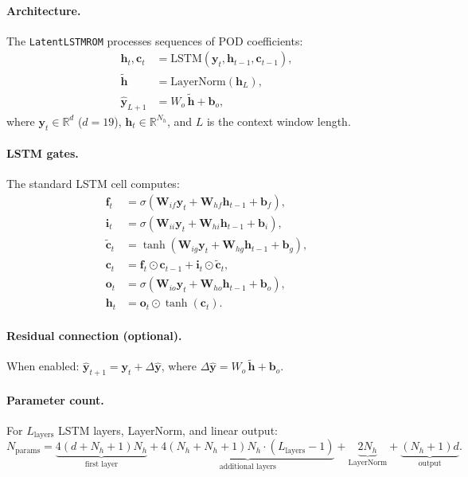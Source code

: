 \documentclass[11pt]{article}
\newcommand{\R}{\mathbb{R}}
\begin{document}
\paragraph{Architecture.}
The \texttt{LatentLSTMROM} processes sequences of POD coefficients:
\begin{align}
  \mathbf{h}_t, \mathbf{c}_t &= \text{LSTM}(\mathbf{y}_t, \mathbf{h}_{t-1}, \mathbf{c}_{t-1}), \\
  \tilde{\mathbf{h}} &= \text{LayerNorm}(\mathbf{h}_L), \\
  \hat{\mathbf{y}}_{L+1} &= W_o\,\tilde{\mathbf{h}} + \mathbf{b}_o,
\end{align}
where $\mathbf{y}_t \in \R^d$ ($d=19$), $\mathbf{h}_t \in \R^{N_h}$,
and $L$ is the context window length.

\paragraph{LSTM gates.}
The standard LSTM cell computes:
\begin{align}
  \mathbf{f}_t &= \sigma(\mathbf{W}_{if}\mathbf{y}_t + \mathbf{W}_{hf}\mathbf{h}_{t-1} + \mathbf{b}_f), \\
  \mathbf{i}_t &= \sigma(\mathbf{W}_{ii}\mathbf{y}_t + \mathbf{W}_{hi}\mathbf{h}_{t-1} + \mathbf{b}_i), \\
  \tilde{\mathbf{c}}_t &= \tanh(\mathbf{W}_{ig}\mathbf{y}_t + \mathbf{W}_{hg}\mathbf{h}_{t-1} + \mathbf{b}_g), \\
  \mathbf{c}_t &= \mathbf{f}_t \odot \mathbf{c}_{t-1} + \mathbf{i}_t \odot \tilde{\mathbf{c}}_t, \\
  \mathbf{o}_t &= \sigma(\mathbf{W}_{io}\mathbf{y}_t + \mathbf{W}_{ho}\mathbf{h}_{t-1} + \mathbf{b}_o), \\
  \mathbf{h}_t &= \mathbf{o}_t \odot \tanh(\mathbf{c}_t).
\end{align}

\paragraph{Residual connection (optional).}
When enabled:
$\hat{\mathbf{y}}_{t+1} = \mathbf{y}_t + \Delta\hat{\mathbf{y}}$,
where $\Delta\hat{\mathbf{y}} = W_o\,\tilde{\mathbf{h}} + \mathbf{b}_o$.

\paragraph{Parameter count.}
For $L_{\text{layers}}$ LSTM layers, LayerNorm, and linear output:
\begin{equation}
  N_{\text{params}} = \underbrace{4(d + N_h + 1)N_h}_{\text{first layer}}
  + \underbrace{4(N_h + N_h + 1)N_h \cdot (L_{\text{layers}}-1)}_{\text{additional layers}}
  + \underbrace{2N_h}_{\text{LayerNorm}}
  + \underbrace{(N_h + 1)d}_{\text{output}}.
\end{equation}
\end{document}
